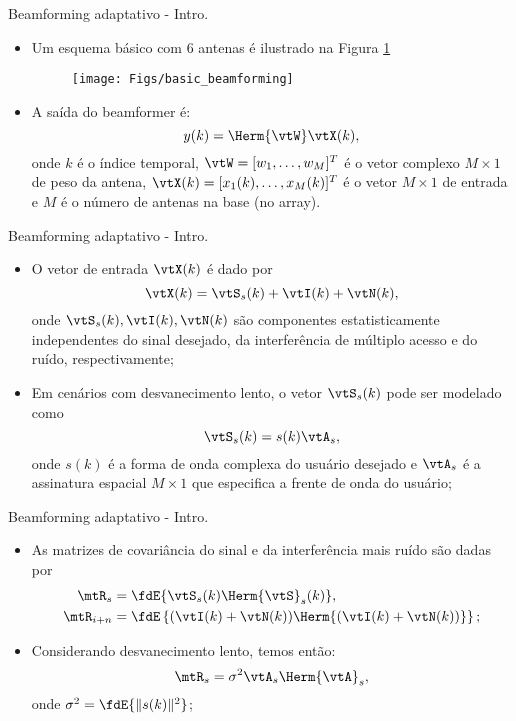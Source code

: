 \begin{frame}{Beamforming adaptativo - Intro.}
	\begin{itemize}
		\item Um esquema básico com 6 antenas é ilustrado na Figura \ref{fig:basic_beamforming}
		\begin{figure}
			\centering
      \texttt{[image: Figs/basic\_beamforming]}\label{fig:basic_beamforming}
	  \end{figure}
	  \item A saída do beamformer é:
	  \[ y(k) = \Herm{\vtW}\vtX(k),
	  \]
	  onde $k$ é o índice temporal, $\vtW = [w_1,\ldots,w_M]^T$ é o vetor complexo $M\times 1$ de peso da antena, $\vtX(k)=[x_1(k),\ldots,x_M(k)]^T$ é o vetor $M\times 1$ de entrada e $M$ é o número de antenas na base (no array).
	\end{itemize}
\end{frame}

\begin{frame}{Beamforming adaptativo - Intro.}
	\begin{itemize}
		\item O vetor de entrada $\vtX(k)$ é dado por
		\[
			\vtX(k) = \vtS_s(k) + \vtI(k) + \vtN(k),
		\]
		onde $\vtS_s(k),\vtI(k), \vtN(k)$ são componentes estatisticamente independentes do sinal desejado, da interferência de múltiplo acesso e do ruído, respectivamente;
		\item Em cenários com desvanecimento lento, o vetor $\vtS_s(k)$ pode ser modelado como 
		\[
		\vtS_s(k)=s(k)\vtA_s,
		\]
		onde $s(k)$ é a forma de onda complexa do usuário desejado e $\vtA_s$ é a assinatura espacial $M\times 1$ que especifica a frente de onda do usuário;
	\end{itemize}
\end{frame}

\begin{frame}{Beamforming adaptativo - Intro.}
	\begin{itemize}
		\item As matrizes de covariância do sinal e da interferência mais ruído são dadas por
		\begin{align}
		  \mtR_s &= \fdE\{\vtS_s(k)\Herm{\vtS}_s(k)\},\\
		  \mtR_{i+n} &= \fdE\left\{(\vtI(k)+\vtN(k))\Herm{(\vtI(k)+\vtN(k))}\right\};
		\end{align}
		\item Considerando desvanecimento lento, temos então:
		\begin{equation}
		  \mtR_s = \sigma^2 \vtA_s \Herm{\vtA}_s,
		\end{equation}
		onde $\sigma^2 = \fdE\{\|s(k)\|^2\}$;
	\end{itemize}
\end{frame}


